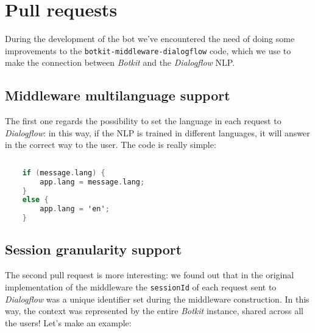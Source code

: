 \chapter{Pull requests}
	During the development of the bot we've encountered the need of doing some improvements to the \texttt{botkit-middleware-dialogflow} code, which we use to make the connection between \textit{Botkit} and the \textit{Dialogflow} NLP.
	
	\section{Middleware multilanguage support}
	The first one\cite{pr1} regards the possibility to set the language in each request to \textit{Dialogflow}: in this way, if the NLP is trained in different languages, it will answer in the correct way to the user. The code is really simple:
	
	\begin{lstlisting}[language=C]
	
	if (message.lang) {
		app.lang = message.lang;
	}
	else {
		app.lang = 'en';
	}
	\end{lstlisting}
	
	\section{Session granularity support}
	The second pull request is more interesting: we found out that in the original implementation of the middleware the \texttt{sessionId} of each request sent to \textit{Dialogflow} was a unique identifier set during the middleware construction. In this way, the context was represented by the entire \textit{Botkit} instance, shared across all the users! Let's make an example:
	
